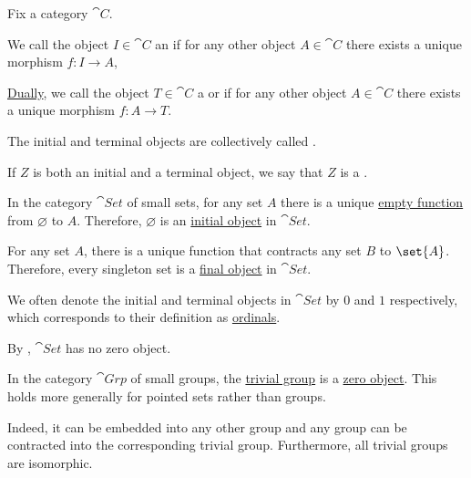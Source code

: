 \begin{definition}\label{def:universal_objects}
  Fix a category \( \cat{C} \).

  \begin{thmenum}
     We call the object \( I \in \cat{C} \) an  if for any other object \( A \in \cat{C} \) there exists a unique morphism \( f: I \to A \),

     \hyperref[thm:categorical_principle_of_duality]{Dually}, we call the object \( T \in \cat{C} \) a  or  if for any other object \( A \in \cat{C} \) there exists a unique morphism \( f: A \to T \).

    The initial and terminal objects are collectively called .

     If \( Z \) is both an initial and a terminal object, we say that \( Z \) is a .
  \end{thmenum}
\end{definition}

\begin{example}\label{ex:def:universal_objects}
  \begin{thmenum}
     In the category \hyperref[def:category_of_small_sets]{\( \cat{Set} \)} of small sets, for any set \( A \) there is a unique \hyperref[def:set_valued_map/empty]{empty function} from \( \varnothing \) to \( A \). Therefore, \( \varnothing \) is an \hyperref[def:universal_objects/initial]{initial object} in \( \cat{Set} \).

    For any set \( A \), there is a unique function that contracts any set \( B \) to \( \set{ A } \). Therefore, every singleton set is a \hyperref[def:universal_objects/terminal]{final object} in \( \cat{Set} \).

    We often denote the initial and terminal objects in \( \cat{Set} \) by \( 0 \) and \( 1 \) respectively, which corresponds to their definition as \hyperref[def:ordinal]{ordinals}.

    By , \( \cat{Set} \) has no zero object.

     In the category \hyperref[def:group/category]{\( \cat{Grp} \)} of small groups, the \hyperref[def:group/trivial]{trivial group} is a \hyperref[def:universal_objects/zero]{zero object}. This holds more generally for pointed sets rather than groups.

    Indeed, it can be embedded into any other group and any group can be contracted into the corresponding trivial group. Furthermore, all trivial groups are isomorphic.
  \end{thmenum}
\end{example}

